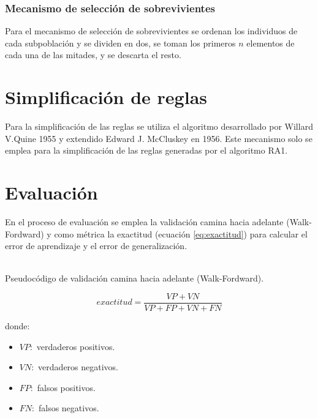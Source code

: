 \subsubsection{Mecanismo de selección de sobrevivientes}

Para el mecanismo de selección de sobrevivientes se ordenan los individuos de cada subpoblación y se dividen en dos, se toman los primeros $n$ elementos de cada una de las mitades, y se descarta el resto.

\section{Simplificación de reglas}

Para la simplificación de las reglas se utiliza el algoritmo desarrollado por Willard V.Quine 1955 y extendido Edward J. McCluskey  en 1956. Este mecanismo solo se emplea para la simplificación de las reglas generadas por el algoritmo RA1.

\section{Evaluación}

En el proceso de evaluación se emplea la validación camina hacia adelante  (Walk-Fordward) y como métrica la exactitud (ecuación \ref{eq:exactitud}) para calcular el error de aprendizaje y el error de generalización.
\\
\\
\begin{algorithm}[H] 
	\SetAlgoLined
	\caption{Pseudocódigo de validación camina hacia adelante (Walk-Fordward).}
\end{algorithm}


\[
exactitud = \frac{VP + VN}{VP+FP+VN+FN} \label{eq:exactitud} 
\]

donde:
\begin{itemize}
	\item $VP:$ verdaderos positivos.
	\item $VN:$ verdaderos negativos.
	\item $FP:$ falsos positivos.
	\item $FN:$ falsos negativos. 
\end{itemize}